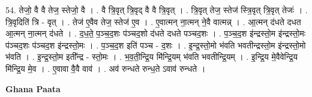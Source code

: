 \documentclass[17pt]{extarticle}
\begin{document}
54. तेजो॒ वै वै तेज॒ स्तेजो॒ वै । . वै त्रि॒वृत् त्रि॒वृद् वै वै त्रि॒वृत् । . त्रि॒वृत् तेज॒ स्तेज॑ स्त्रि॒वृत् त्रि॒वृत् तेजः॑ । . त्रि॒वृदिति॑ त्रि - वृत् । . तेज॑ ए॒वैव तेज॒ स्तेज॑ ए॒व । . ए॒वात्मन् ना॒त्मन् ने॒वै वात्मन्न् । . आ॒त्मन् द॑धते दधत आ॒त्मन् ना॒त्मन् द॑धते । . द॒ध॒ते॒ प॒ञ्च॒द॒शः प॑ञ्चद॒शो द॑धते दधते पञ्चद॒शः । . प॒ञ्च॒द॒श इ॑न्द्रस्तो॒म इ॑न्द्रस्तो॒मः प॑ञ्चद॒शः प॑ञ्चद॒श इ॑न्द्रस्तो॒मः । . प॒ञ्च॒द॒श इति॑ पञ्च - द॒शः । . इ॒न्द्र॒स्तो॒मो भ॑वति भवतीन्द्रस्तो॒म इ॑न्द्रस्तो॒मो भ॑वति । . इ॒न्द्र॒स्तो॒म इती᳚न्द्र - स्तो॒मः । . भ॒व॒ती॒न्द्रि॒य मि॑न्द्रि॒यम् भ॑वति भवतीन्द्रि॒यम् । . इ॒न्द्रि॒य मे॒वैवेन्द्रि॒य मि॑न्द्रि॒य मे॒व । . ए॒वावा वै॒वै वाव॑ । . अव॑ रुन्धते रुन्ध॒ते ऽवाव॑ रुन्धते । \newline

\textbf{Ghana Paata } \newline
\end{document}

